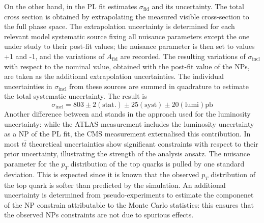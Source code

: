 \documentclass[12pt]{article}
\begin{document}
On the other hand, in \cite{CMS_inclusive} the PL fit estimates $\sigma_{\mathrm{fid}}$ and its uncertainty. The total cross section is obtained by extrapolating the measured visible cross-section to the full phase space. The extrapolation uncertainty is determined for each relevant model systematic source fixing all nuisance parameters except the one under study to their post-fit values; the nuisance parameter is then set to values +1 and -1, and the variations of $A_{\mathrm{fid}}$ are recorded. The resulting variations of $\sigma_{\mathrm{incl}}$ with respect to the nominal value, obtained with the post-fit value of the NPs, are taken as the additional extrapolation uncertainties. The individual uncertainties in $\sigma_{\mathrm{incl}}$ from these sources are summed in quadrature to estimate the total systematic uncertainty. The result is
\begin{equation}
\sigma_{\mathrm{incl}} = 803\pm2(\mathrm{stat.})\pm25(\mathrm{syst})\pm20(\mathrm{lumi})\mathrm{pb}
\end{equation}
Another difference between \cite{Aad_2020} and \cite{CMS_inclusive} stands in the approach used for the luminosity uncertainty: while the ATLAS measurement includes the luminosity uncertainty as a NP of the PL fit, the CMS measurement externalised this contribution.
In \cite{CMS_inclusive} most $t\bar{t}$ theoretical uncertainties show significant constraints with respect to their prior uncertainty, illustrating the strength of the analysis ansatz. The nuisance parameter for the $p_T$ distribution of the top quarks is pulled by one standard deviation. This is expected since it is known that the observed $p_T$ distribution of the top quark is softer than predicted by the simulation. An additional uncertainty is determined from pseudo-experiments to estimate the componenet of the NP constrain attributable to the Monte Carlo statistics: this ensures that the observed NPs constraints are not due to spurious effects.
\end{document}

